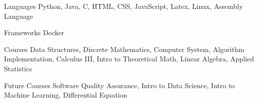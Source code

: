 
\begin{cvskills}
    \cvskill
    {Languages} %
    {Python, Java, C, HTML, CSS, JavaScript, Latex, Linux, Assembly Language} %

    \cvskill
    {Frameworks} %
    {Docker} %
    
    \cvskill
    {Courses} %
    {Data Structures, Discrete Mathematics, Computer System, Algorithm Implementation, Calculus III, Intro to Theoretical Math, Linear Algebra, Applied Statistics}
        
    \cvskill
    {Future Courses}
    {Software Quality Assurance, Intro to Data Science, Intro to Machine Learning, Differential Equation}
    


\end{cvskills}
